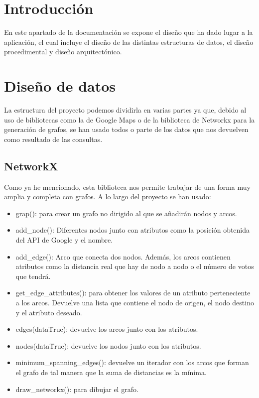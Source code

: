 
\section{Introducción}
En este apartado de la documentación se expone el diseño que ha dado lugar a la aplicación, el cual incluye el diseño de las distintas estructuras de datos, el diseño procedimental y diseño arquitectónico.
\section{Diseño de datos}
La estructura del proyecto podemos dividirla en varias partes ya que, debido al uso de bibliotecas como la de Google Maps o de la biblioteca de Networkx para la generación de grafos, se han usado todos o parte de los datos que nos devuelven como resultado de las consultas.

\subsection{NetworkX}
Como ya he mencionado, esta biblioteca nos permite trabajar de una forma muy amplia y completa con grafos. A lo largo del proyecto se han usado:
\begin{itemize}
	\item grap(): para crear un grafo no dirigido al que se añadirán nodos y arcos.
	\item add\_node(): Diferentes nodos junto con atributos como la posición obtenida del API de Google y el nombre.
	\item add\_edge(): Arco que conecta dos nodos. Además, los arcos contienen atributos como la distancia real que hay de nodo a nodo o el número de votos que tendrá.
	\item get\_edge\_attributes(): para obtener los valores de un atributo perteneciente a los arcos. Devuelve una lista que contiene el nodo de origen, el nodo destino y el atributo deseado.
	\item edges(data\=True): devuelve los arcos junto con los atributos.
	\item nodes(data\=True): devuelve los nodos junto con los atributos.
	\item minimum\_spanning\_edges(): devuelve un iterador con los arcos que forman el grafo de tal manera que la suma de distancias es la mínima.
	\item draw\_networkx(): para dibujar el grafo.
\end{itemize}


